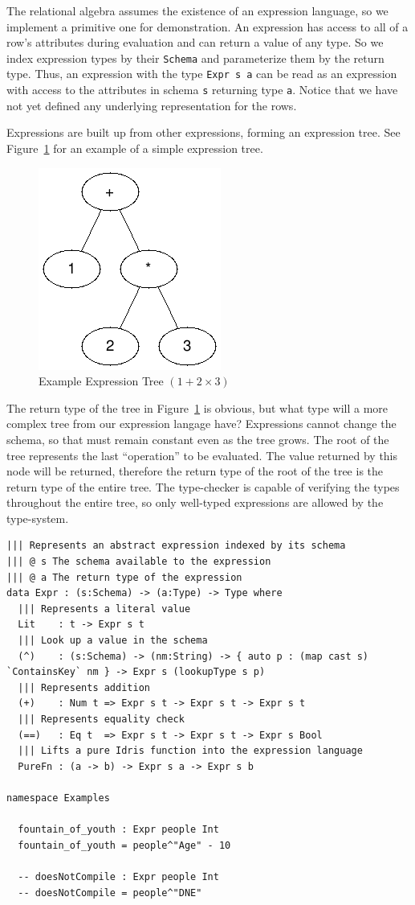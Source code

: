 \documentclass[12pt]{article}
\begin{document}
The relational algebra assumes the existence of an expression language, so we implement a primitive one for demonstration.
An expression has access to all of a row's attributes during evaluation and can return a value of any type.
So we index expression types by their \texttt{Schema} and parameterize them by the return type.
Thus, an expression with the type \texttt{Expr s a} can be read as an expression with access to the attributes in schema \texttt{s} returning type \texttt{a}.
Notice that we have not yet defined any underlying representation for the rows.

Expressions are built up from other expressions, forming an expression tree.
See Figure~\ref{fig:expr_tree} for an example of a simple expression tree.

\begin{figure}[h!]
    \centering
    \includegraphics[width=0.25\linewidth]{assets/expr_tree.png}
    \caption{Example Expression Tree $(1 + 2 \times 3)$}
    \label{fig:expr_tree}
\end{figure}

The return type of the tree in Figure~\ref{fig:expr_tree} is obvious, but what type will a more complex tree from our expression langage have?
Expressions cannot change the schema, so that must remain constant even as the tree grows.
The root of the tree represents the last ``operation'' to be evaluated.
The value returned by this node will be returned, therefore the return type of the root of the tree is the return type of the entire tree.
The type-checker is capable of verifying the types throughout the entire tree, so only well-typed expressions are allowed by the type-system.

\begin{lstlisting}
||| Represents an abstract expression indexed by its schema
||| @ s The schema available to the expression
||| @ a The return type of the expression
data Expr : (s:Schema) -> (a:Type) -> Type where
  ||| Represents a literal value
  Lit    : t -> Expr s t
  ||| Look up a value in the schema
  (^)    : (s:Schema) -> (nm:String) -> { auto p : (map cast s) `ContainsKey` nm } -> Expr s (lookupType s p)
  ||| Represents addition
  (+)    : Num t => Expr s t -> Expr s t -> Expr s t
  ||| Represents equality check
  (==)   : Eq t  => Expr s t -> Expr s t -> Expr s Bool
  ||| Lifts a pure Idris function into the expression language
  PureFn : (a -> b) -> Expr s a -> Expr s b

namespace Examples

  fountain_of_youth : Expr people Int
  fountain_of_youth = people^"Age" - 10

  -- doesNotCompile : Expr people Int
  -- doesNotCompile = people^"DNE"
\end{lstlisting}
\end{document}
